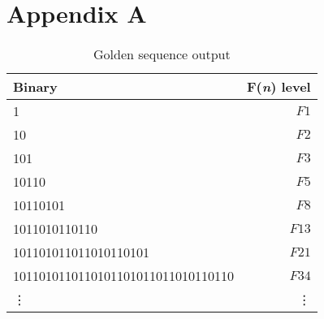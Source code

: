 \documentclass[11pt,twoside]{article}
\begin{document}
\newpage

\section*{Appendix A}\label{gsappend}
\begin{table}[!hbp]\caption{Golden sequence output}\label{gsop}
\begin{tabular}[c]{l @{} r}
Binary & F(\textsl{n}) level\\
\hline
1 & $F1$\\
10 & $F2$\\
101 & $F3$\\
10110 & $F5$\\
10110101 & $F8$\\
1011010110110 & $F13$\\
101101011011010110101 & $F21$\\
1011010110110101101011011010110110 & $F34$\\
\vdots & \vdots
\end{tabular}
\end{table}
\end{document}
